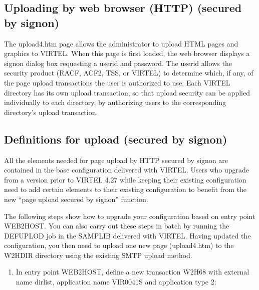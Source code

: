 \documentclass[letterpaper,10pt,english]{sphinxmanual}
\begin{document}
\subsection{Uploading by web browser (HTTP) (secured by signon)}
\label{\detokenize{audit_operations_ and_performance:uploading-by-web-browser-http-secured-by-signon}}\label{\detokenize{audit_operations_ and_performance:index-57}}
\sphinxAtStartPar
The upload4.htm page allows the administrator to upload HTML pages and graphics to VIRTEL. When this page is first loaded, the web browser displays a signon dialog box requesting a userid and password. The userid allows the security product (RACF, ACF2, TSS, or VIRTEL) to determine which, if any, of the page upload transactions the user is authorized to use. Each VIRTEL directory has its own upload transaction, so that upload security can be applied individually to each directory, by authorizing users to the corresponding directory’s upload transaction.

\ignorespaces 

\subsection{Definitions for upload (secured by signon)}
\label{\detokenize{audit_operations_ and_performance:definitions-for-upload-secured-by-signon}}\label{\detokenize{audit_operations_ and_performance:index-58}}
\sphinxAtStartPar
All the elements needed for page upload by HTTP secured by signon are contained in the base configuration delivered with VIRTEL. Users who upgrade from a version prior to VIRTEL 4.27 while keeping their existing configuration need to add certain elements to their existing configuration to benefit from the new “page upload secured by signon” function.

\sphinxAtStartPar
The following steps show how to upgrade your configuration based on entry point WEB2HOST. You can also carry out these steps in batch by running the DEFUPLOD job in the SAMPLIB delivered with VIRTEL. Having updated the configuration, you then need to upload one new page (upload4.htm) to the W2H\sphinxhyphen{}DIR directory using the existing SMTP upload method.
\begin{enumerate}
%
\item {} 
\sphinxAtStartPar
In entry point WEB2HOST, define a new transaction W2H\sphinxhyphen{}68 with external name dirlist, application name VIR0041S and application type 2:

\end{enumerate}
\end{document}

